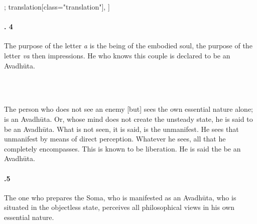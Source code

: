 \begin{alignment}[
  texts=edition[class="edition"];
  translation[class="translation"],
  ]
\begin{translation}
\begin{tlate}[44_4]
      \paragraph{. 4} The purpose of the letter \textit{a} is the being of the embodied soul, the purpose of the letter \textit{va} then impressions. He who knows this couple is declared to be an Avadhūta.
      \end{tlate}
      \\\\
      \begin{tlate}[p44_02]
      The person who does not see an enemy [but] sees the own essential nature alone; is an Avadhūta. Or, whose mind does not create the unsteady state, he is said to be an Avadhūta. What is not seen, it is said, is the unmanifest. He sees that unmanifest by means of direct perception. Whatever he sees, all that he completely encompasses. This is known to be liberation. He is said the be an Avadhūta.
    \end{tlate}
    \begin{tlate}[44_5]
\paragraph{.5} The one who prepares the Soma, who is manifested as an Avadhūta, who is situated in the objectless state, perceives all philosophical views in his own essential nature.
    \end{tlate}
  \end{translation}
\end{alignment}
\pagebreak %
